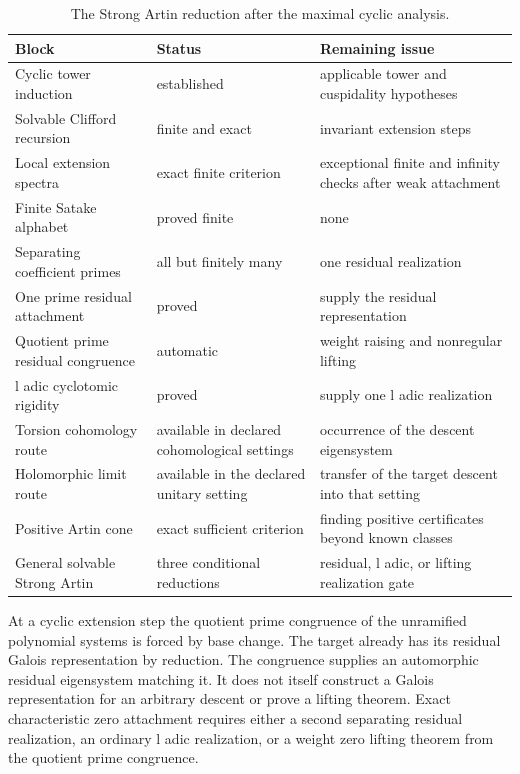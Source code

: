 \begin{table}[t]
\centering
\caption{The Strong Artin reduction after the maximal cyclic analysis.}
\label{tab:reduction_ledger}
\begin{tabular}{>{\raggedright\arraybackslash}p{}>{\raggedright\arraybackslash}p{}>{\raggedright\arraybackslash}p{}}
\toprule
Block & Status & Remaining issue\\
\midrule
Cyclic tower induction & established & applicable tower and cuspidality hypotheses\\
Solvable Clifford recursion & finite and exact & invariant extension steps\\
Local extension spectra & exact finite criterion & exceptional finite and infinity checks after weak attachment\\
Finite Satake alphabet & proved finite & none\\
Separating coefficient primes & all but finitely many & one residual realization\\
One prime residual attachment & proved & supply the residual representation\\
Quotient prime residual congruence & automatic & weight raising and nonregular lifting\\
l adic cyclotomic rigidity & proved & supply one l adic realization\\
Torsion cohomology route & available in declared cohomological settings & occurrence of the descent eigensystem\\
Holomorphic limit route & available in the declared unitary setting & transfer of the target descent into that setting\\
Positive Artin cone & exact sufficient criterion & finding positive certificates beyond known classes\\
General solvable Strong Artin & three conditional reductions & residual, l adic, or lifting realization gate\\
\bottomrule
\end{tabular}
\end{table}

At a cyclic extension step the quotient prime congruence of the unramified polynomial systems is forced by base change. The target already has its residual Galois representation by reduction. The congruence supplies an automorphic residual eigensystem matching it. It does not itself construct a Galois representation for an arbitrary descent or prove a lifting theorem. Exact characteristic zero attachment requires either a second separating residual realization, an ordinary l adic realization, or a weight zero lifting theorem from the quotient prime congruence.

